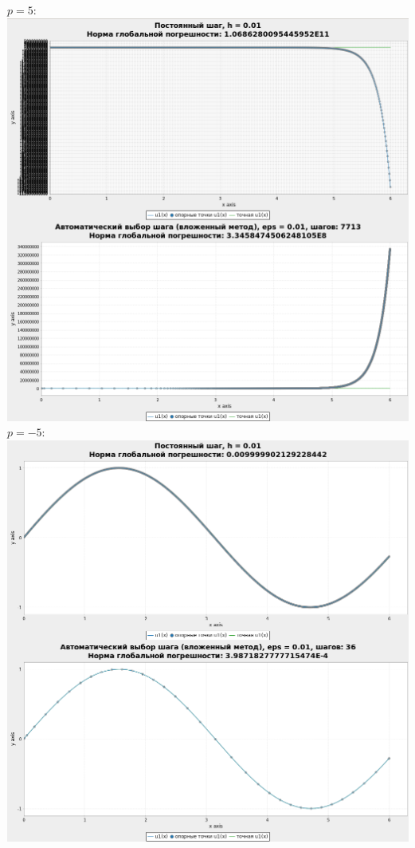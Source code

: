 \documentclass[a4paper,12pt]{article}
\begin{document}
\begin{flushleft}
\begin{enumerate}
      $p = 5:$\linebreak\linebreak\includegraphics{sc5.png}\linebreak\linebreak
      $p = -5:$\linebreak\linebreak\includegraphics{scm5.png}\linebreak\linebreak

\end{enumerate}
\end{flushleft}
\end{document}
